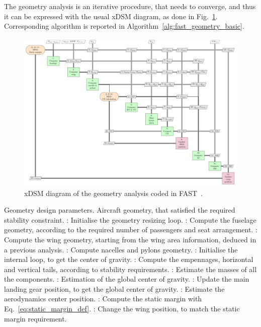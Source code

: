 The geometry analysis is an iterative procedure, that needs to converge, and thus it can be expressed with the usual xDSM diagram, as done in Fig.~\ref{fig:fast_geom_basic}. 
Corresponding algorithm is reported in Algorithm~\ref{alg:fast_geometry_basic}.
\begin{figure}[!h]
	\centering
	\includegraphics[keepaspectratio, width=1.2\textwidth, angle=90]{images/chap2/FAST_geometry}
	\caption{xDSM diagram of the geometry analysis coded in FAST~\cite{bib:lambe_xdsm}.}
	\label{fig:fast_geom_basic}
\end{figure}

\begin{algorithm}[!h]
	\caption{Algorithm for the geometry module of FAST, shown in Fig.~\ref{fig:fast_geom_basic}.}
	\label{alg:fast_geometry_basic}
	\begin{algorithmic}
		\REQUIRE Geometry design parameters.
		\ENSURE Aircraft geometry, that satisfied the required stability constraint.
		: Initialise the geometry resizing loop.
		\REPEAT
		: Compute the fuselage geometry, according to the required number of passengers and seat arrangement.
		: Compute the wing geometry, starting from the wing area information, deduced in a previous analysis.
		: Compute nacelles and pylons geometry.
		: Initialise the internal loop, to get the center of gravity.
		\REPEAT
		: Compute the empennages, horizontal and vertical tails, according to stability requirements.
		: Estimate the masses of all the components.
		: Estimation of the global center of gravity.
		: Update the main landing gear position, to get the global center of gravity.
		: Estimate the aerodynamics center position.
		: Compute the static margin with Eq.~\eqref{eq:static_margin_def}.
		: Change the wing position, to match the static margin requirement.
	\end{algorithmic}
\end{algorithm}

